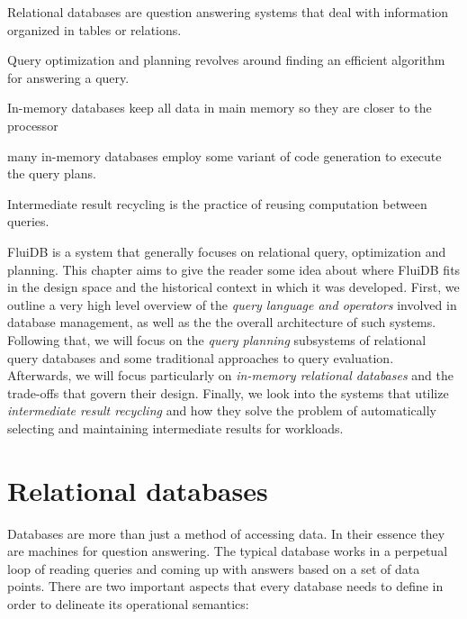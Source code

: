 
\begin{summary}
\item Relational databases are question answering systems that deal
  with information organized in tables or relations.
\item Query optimization and planning revolves around finding an
  efficient algorithm for answering a query.
\item In-memory databases keep all data in main memory so they are
  closer to the processor
\item many in-memory databases employ some variant of code generation
  to execute the query plans.
\item Intermediate result recycling is the practice of reusing
  computation between queries.
\end{summary}

FluiDB is a system that generally focuses on relational query,
optimization and planning. This chapter aims to give the reader some
idea about where FluiDB fits in the design space and the historical
context in which it was developed.  First, we outline a very high
level overview of the \emph{query language and operators} involved in
database management, as well as the the overall architecture of such
systems. Following that, we will focus on the \emph{query planning}
subsystems of relational query databases and some traditional
approaches to query evaluation. Afterwards, we will focus particularly
on \emph{in-memory relational databases} and the trade-offs that
govern their design. Finally, we look into the systems that utilize
\emph{intermediate result recycling} and how they solve the problem of
automatically selecting and maintaining intermediate results for
workloads.

\section{Relational databases}

Databases are more than just a method of accessing data. In their
essence they are machines for question answering. The typical database
works in a perpetual loop of reading queries and coming up with
answers based on a set of data points. There are two important aspects
that every database needs to define in order to delineate its
operational semantics:

